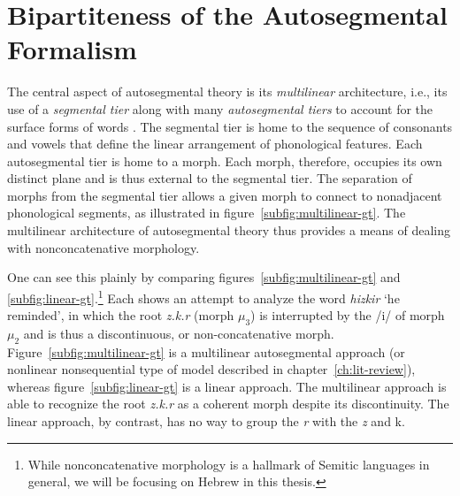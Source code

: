 \section{Bipartiteness of the Autosegmental Formalism}\label{sec:autoseg-bipart}
The central aspect of autosegmental theory 
is its \emph{multilinear} architecture, i.e., its use of a 
\emph{segmental tier} along with many \emph{autosegmental tiers} to 
account for the surface forms of words \citet{mccarthy:1981}. The segmental tier is home to the sequence of consonants and vowels that define the linear arrangement of phonological features. Each autosegmental tier is home to a morph. Each morph, therefore, occupies its own distinct plane and is thus external to the segmental tier. The separation of morphs from the segmental tier allows a given morph to connect to nonadjacent phonological segments, as illustrated in figure~\ref{subfig:multilinear-gt}. 
The multilinear architecture of autosegmental theory thus provides a means of
dealing with nonconcatenative morphology. 

One can see this plainly by comparing figures~\ref{subfig:multilinear-gt} and 
\ref{subfig:linear-gt}.\footnote{While nonconcatenative morphology is a hallmark of Semitic languages in general, we will be focusing on Hebrew in this thesis.}  Each shows an attempt to analyze the word \emph{hizkir} `he reminded', 
in which the root \textit{z.k.r} (morph $\mu_3$) is interrupted by the /i/ of morph 
$\mu_2$ and is thus a discontinuous, or non-concatenative morph. 
Figure~\ref{subfig:multilinear-gt} is a multilinear autosegmental approach 
(or nonlinear nonsequential type of model described in chapter~\ref{ch:lit-review}), 
whereas figure~\ref{subfig:linear-gt} is a linear approach. The multilinear approach 
is able to recognize the root \textit{z.k.r} as a coherent morph despite its discontinuity. 
The linear approach, by contrast, has no way to group the \textit{r} with the \textit{z} and {k}.


